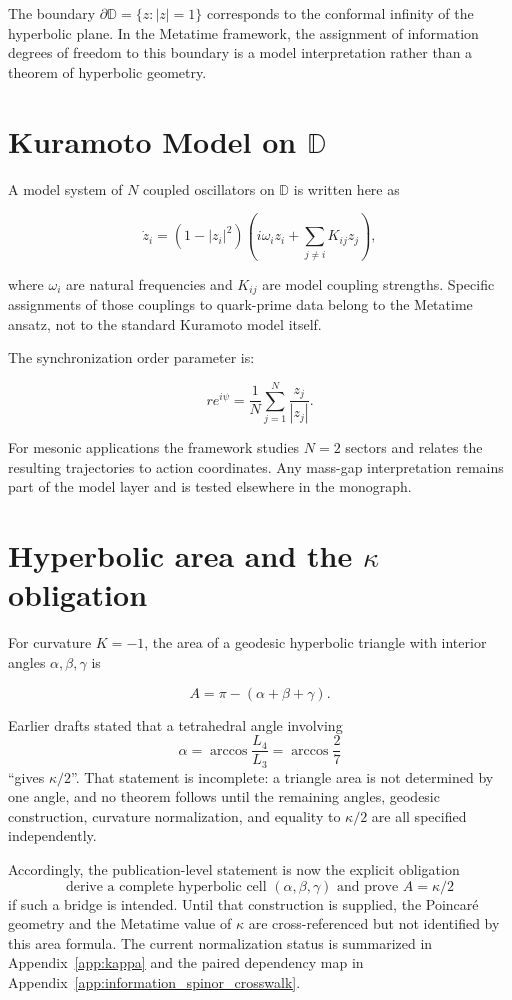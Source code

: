 The boundary $\partial\mathbb{D} = \{z : |z| = 1\}$ corresponds to the
conformal infinity of the hyperbolic plane.  In the Metatime framework,
the assignment of information degrees of freedom to this boundary is a model
interpretation rather than a theorem of hyperbolic geometry.

\section{Kuramoto Model on $\mathbb{D}$}

A model system of $N$ coupled oscillators on $\mathbb{D}$ is written here as

\[
\dot{z}_i = (1 - |z_i|^2)\left(i\omega_i z_i + \sum_{j\neq i} K_{ij} z_j\right),
\]

where $\omega_i$ are natural frequencies and $K_{ij}$ are model coupling
strengths.  Specific assignments of those couplings to quark-prime data belong
to the Metatime ansatz, not to the standard Kuramoto model itself.

The synchronization order parameter is:

\[
r e^{i\psi} = \frac{1}{N}\sum_{j=1}^N \frac{z_j}{|z_j|}.
\]

For mesonic applications the framework studies $N=2$ sectors and relates the
resulting trajectories to action coordinates.  Any mass-gap interpretation
remains part of the model layer and is tested elsewhere in the monograph.

\section{Hyperbolic area and the $\kappa$ obligation}

For curvature $K=-1$, the area of a geodesic hyperbolic triangle with interior
angles $\alpha,\beta,\gamma$ is

\[
A = \pi - (\alpha + \beta + \gamma).
\]

Earlier drafts stated that a tetrahedral angle involving
\[
\alpha = \arccos\frac{L_4}{L_3} = \arccos\frac{2}{7}
\]
``gives $\kappa/2$''.  That statement is incomplete: a triangle area is not
determined by one angle, and no theorem follows until the remaining angles,
geodesic construction, curvature normalization, and equality to $\kappa/2$
are all specified independently.

Accordingly, the publication-level statement is now the explicit obligation
\[
\boxed{
\text{derive a complete hyperbolic cell }(\alpha,\beta,\gamma)
\text{ and prove }A=\kappa/2
}
\]
if such a bridge is intended.  Until that construction is supplied, the
Poincar\'e geometry and the Metatime value of $\kappa$ are cross-referenced but
not identified by this area formula.  The current normalization status is
summarized in Appendix~\ref{app:kappa} and the paired dependency map in
Appendix~\ref{app:information_spinor_crosswalk}.
